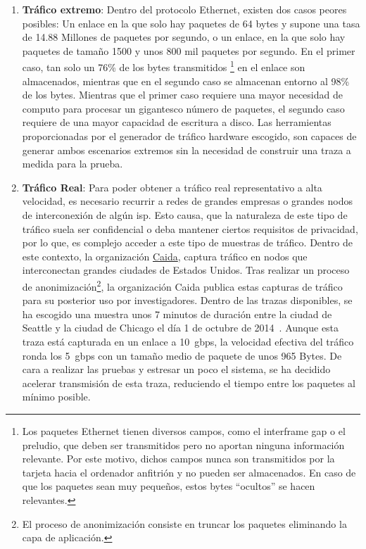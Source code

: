 \begin{enumerate}

\item \textbf{Tráfico extremo}: Dentro del protocolo Ethernet, existen dos casos peores posibles: Un enlace en la que solo hay paquetes de 64 bytes y supone una tasa de 14.88 Millones de paquetes por segundo, o un enlace, en la que solo hay paquetes de tamaño 1500 y unos 800 mil paquetes por segundo.
En el primer caso, tan solo un 76\% de los bytes transmitidos%
\footnote{Los paquetes Ethernet tienen diversos campos, como el interframe gap o el preludio, que deben ser transmitidos pero no aportan ninguna información relevante. Por este motivo, dichos campos nunca son transmitidos por la tarjeta hacia el ordenador anfitrión y no pueden ser almacenados. En caso de que los paquetes sean muy pequeños, estos bytes ``ocultos'' se hacen relevantes.} %
 en el enlace son almacenados, mientras que en el segundo caso se almacenan entorno al 98\% de los bytes. Mientras que el primer caso requiere una mayor necesidad de computo para procesar un gigantesco número de paquetes, el segundo caso requiere de una mayor capacidad de escritura a disco.
Las herramientas proporcionadas por el generador de tráfico hardware escogido, son capaces de generar ambos escenarios extremos sin la necesidad de construir una traza a medida para la prueba.

\item \textbf{Tráfico Real}: Para poder obtener a tráfico real representativo a alta velocidad, es necesario recurrir a redes de grandes empresas o grandes nodos de interconexión de algún \gls{isp}. Esto causa, que la naturaleza de este tipo de tráfico suela ser confidencial o deba mantener ciertos requisitos de privacidad, por lo que, es complejo acceder a este tipo de muestras de tráfico.
Dentro de este contexto, la organización \href{http://www.caida.org/home/}{Caida}, captura tráfico en nodos que interconectan grandes ciudades de Estados Unidos. Tras realizar un proceso de anonimización\footnote{El proceso de anonimización consiste en truncar los paquetes eliminando la capa de aplicación.}, la organización Caida publica estas capturas de tráfico para su posterior uso por investigadores. Dentro de las trazas disponibles, se ha escogido una muestra unos 7 minutos de duración entre la ciudad de Seattle y la ciudad de Chicago el día 1 de octubre de 2014~\cite{caida2014}. Aunque esta traza está capturada en un enlace a 10~\gls{gbps}, la velocidad efectiva del tráfico ronda los 5~\gls{gbps} con un tamaño medio de paquete de unos 965 Bytes. De cara a realizar las pruebas y estresar un poco el sistema, se ha decidido acelerar transmisión de esta traza, reduciendo el tiempo entre los paquetes al mínimo posible.

\end{enumerate}

